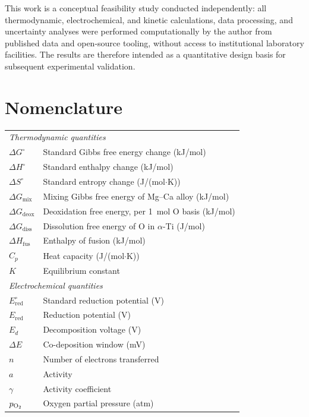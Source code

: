 \documentclass[11pt]{article}
\begin{document}
This work is a conceptual feasibility study conducted independently: all thermodynamic, electrochemical, and kinetic calculations, data processing, and uncertainty analyses were performed computationally by the author from published data and open-source tooling, without access to institutional laboratory facilities. The results are therefore intended as a quantitative design basis for subsequent experimental validation.

\newpage

\section*{Nomenclature}

\begin{singlespace}
\small
\begin{tabular}{ll}
\multicolumn{2}{l}{\textit{Thermodynamic quantities}} \\
$\Delta G^{\circ}$ & Standard Gibbs free energy change (kJ/mol) \\
$\Delta H^{\circ}$ & Standard enthalpy change (kJ/mol) \\
$\Delta S^{\circ}$ & Standard entropy change (J/(mol$\cdot$K)) \\
$\Delta G_{\mathrm{mix}}$ & Mixing Gibbs free energy of Mg--Ca alloy (kJ/mol) \\
$\Delta G_{\mathrm{deox}}$ & Deoxidation free energy, per 1~mol O basis (kJ/mol) \\
$\Delta G_{\mathrm{diss}}$ & Dissolution free energy of O in $\alpha$-Ti (J/mol) \\
$\Delta H_{\mathrm{fus}}$ & Enthalpy of fusion (kJ/mol) \\
$C_p$ & Heat capacity (J/(mol$\cdot$K)) \\
$K$ & Equilibrium constant \\
\multicolumn{2}{l}{\textit{Electrochemical quantities}} \\
$E^{\circ}_{\mathrm{red}}$ & Standard reduction potential (V) \\
$E_{\mathrm{red}}$ & Reduction potential (V) \\
$E_d$ & Decomposition voltage (V) \\
$\Delta E$ & Co-deposition window (mV) \\
$n$ & Number of electrons transferred \\
$a$ & Activity \\
$\gamma$ & Activity coefficient \\
$p_{\ce{O2}}$ & Oxygen partial pressure (atm) \\

\end{tabular}
\end{singlespace}
\end{document}
